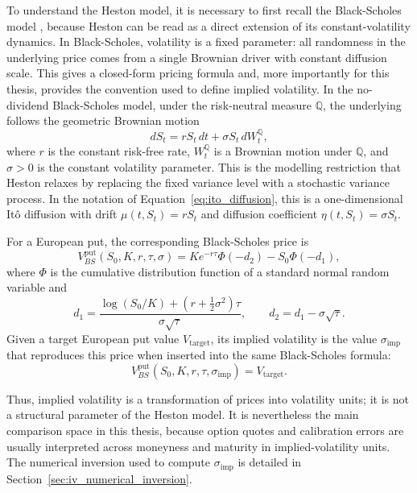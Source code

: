 To understand the Heston model, it is necessary to first recall the Black-Scholes model \cite{black_scholes_1973,hull_options}, because Heston can be read as a direct extension of its constant-volatility dynamics. In Black-Scholes, volatility is a fixed parameter: all randomness in the underlying price comes from a single Brownian driver with constant diffusion scale. This gives a closed-form pricing formula and, more importantly for this thesis, provides the convention used to define implied volatility. In the no-dividend Black-Scholes model, under the risk-neutral measure $\mathbb Q$, the underlying follows the geometric Brownian motion
\begin{equation}
    \label{eq:bs_dynamics}
    dS_t = rS_t\,dt+\sigma S_t\,dW_t^{\mathbb Q},
\end{equation}
where $r$ is the constant risk-free rate, $W_t^{\mathbb Q}$ is a Brownian motion under $\mathbb Q$, and $\sigma>0$ is the constant volatility parameter. This is the modelling restriction that Heston relaxes by replacing the fixed variance level with a stochastic variance process.
In the notation of Equation~\eqref{eq:ito_diffusion}, this is a one-dimensional It\^o diffusion with drift $\mu(t,S_t)=rS_t$ and diffusion coefficient $\eta(t,S_t)=\sigma S_t$.

For a European put, the corresponding Black-Scholes price is
\begin{equation}
    \label{eq:bs_put_formula}
    V_{BS}^{\mathrm{put}}(S_0,K,r,\tau,\sigma)
    =Ke^{-r\tau}\Phi(-d_2)-S_0\Phi(-d_1),
\end{equation}
where $\Phi$ is the cumulative distribution function of a standard normal random variable and
\begin{equation}
    \label{eq:bs_d1_d2}
    d_1=\frac{\log(S_0/K)+(r+\frac{1}{2}\sigma^2)\tau}{\sigma\sqrt{\tau}},
    \qquad
    d_2=d_1-\sigma\sqrt{\tau}.
\end{equation}
Given a target European put value $V_{\text{target}}$, its implied volatility is the value $\sigma_{\mathrm{imp}}$ that reproduces this price when inserted into the same Black-Scholes formula:
\begin{equation}
    \label{eq:bs_iv_definition}
    V_{BS}^{\mathrm{put}}(S_0,K,r,\tau,\sigma_{\mathrm{imp}})=V_{\text{target}}.
\end{equation}

Thus, implied volatility is a transformation of prices into volatility units; it is not a structural parameter of the Heston model. It is nevertheless the main comparison space in this thesis, because option quotes and calibration errors are usually interpreted across moneyness and maturity in implied-volatility units. The numerical inversion used to compute $\sigma_{\mathrm{imp}}$ is detailed in Section~\ref{sec:iv_numerical_inversion}.

